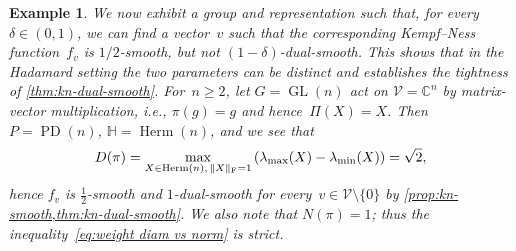 \documentclass[11pt,letterpaper]{article}
\newtheorem{example}[theorem]{Example}\AddToHook{env/example/begin}{\crefalias{theorem}{example}}
\numberwithin{equation}{section}
\newcommand{\CC}{\mathbb{C}}
\newcommand{\bbH}{\mathbb{H}}
\newcommand{\VV}{\mathcal{V}}
\DeclareMathOperator{\PD}{PD}
\DeclareMathOperator{\GL}{GL}
\DeclareMathOperator{\Herm}{Herm}
\DeclarePairedDelimiter\norm{\lVert}{\rVert}
\begin{document}
\begin{example}\label{ex:countersmooth}
We now exhibit a group and representation such that, for every~$\delta\in(0,1)$, we can find a vector~$v$ such that the corresponding Kempf--Ness function~$f_v$ is $1/2$-smooth, but not $(1-\delta)$-dual-smooth.
This shows that in the Hadamard setting the two parameters can be distinct and establishes the tightness of \cref{thm:kn-dual-smooth}.
For~$n\geq2$, let $G=\GL(n)$ act on $\VV=\CC^n$ by matrix-vector multiplication, i.e., $\pi(g) = g$ and hence~$\Pi(X)=X$.
Then $P=\PD(n)$, $\bbH=\Herm(n)$, and we see that
\begin{align}\label{eq:fundamental diam}
    D(\pi)
= \max_{X \in \Herm(n), \, \norm X_{\mathrm F} = 1} \left( \lambda_{\max}(X) - \lambda_{\min}(X) \right)
= \sqrt 2,
\end{align}
hence $f_v$ is $\frac12$-smooth and $1$-dual-smooth for every~$v \in \VV\setminus\{0\}$ by \cref{prop:kn-smooth,thm:kn-dual-smooth}.
We also note that $N(\pi) = 1$; thus the inequality~\eqref{eq:weight diam vs norm} is strict.


\end{example}
\end{document}
